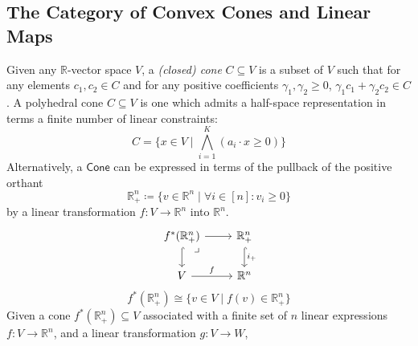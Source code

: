 \documentclass[12pt]{article}
\theoremstyle{definition}
\theoremstyle{remark}
\newcommand{\cone}{\mathsf{Cone}} %
\newcommand{\drpb}[1]{\ar[dr, phantom, "\lrcorner", very near start, #1]}
\begin{document}
\subsection{The Category of Convex Cones and Linear Maps}

Given any $\mathbb{R}$-vector space $V$, a \textit{(closed) cone} $C \subseteq V$ is a subset of $V$ such that for any elements $c_1, c_2 \in C$ and for any positive coefficients $\gamma_1, \gamma_2 \geq 0$, $\gamma_1 c_1 + \gamma_2 c_2 \in C$. A polyhedral cone $C \subseteq V$ is one which admits a half-space representation in terms a finite number of linear constraints:
\begin{equation}
    C = \{ x \in V \mid \bigwedge_{i=1}^{K} (a_i \cdot x \geq 0) \}
\end{equation}
Alternatively, a $\cone$ can be expressed in terms of the pullback of the positive orthant
\begin{equation}
    \mathbb{R}_{+}^{n} \coloneqq \{v \in \mathbb{R}^n \mid \forall i \in [n]: v_i \geq 0 \}
\end{equation}
by a linear transformation $f : V \to \mathbb{R}^{n}$ into $\mathbb{R}^{n}$.
\begin{equation}
    \begin{tikzcd}
        f^{*}(\mathbb{R}^n_+) \drpb{xshift=-2mm} \ar[r] \ar[d, hook] &  \mathbb{R}^n_+ \ar[d, hook, "i_+"] \\
        V \ar[r, "f"] & \mathbb{R}^n
    \end{tikzcd}
\end{equation}
\begin{equation}
    f^{*}(\mathbb{R}^n_+) \cong \{ v \in V \mid f(v) \in \mathbb{R}^n_+ \}
\end{equation}
Given a cone $f^{*}(\mathbb{R}^n_+) \subseteq V$ associated with a finite set of $n$ linear expressions $f : V \to \mathbb{R}^n$, and a linear transformation $g : V \to W$,
\end{document}
